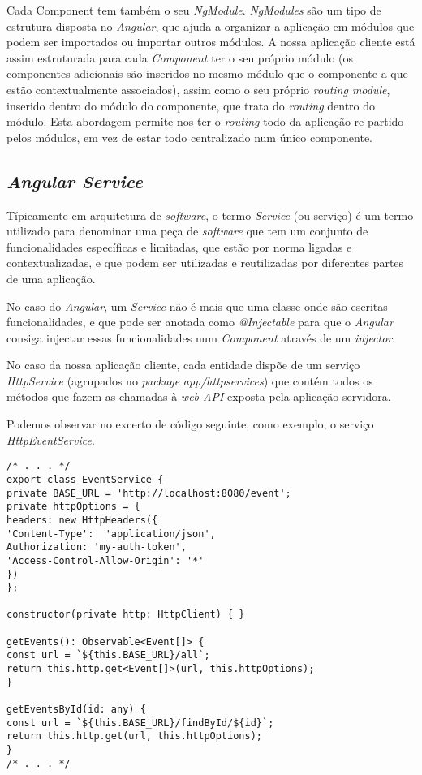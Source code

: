 Cada Component tem também o seu \textit{NgModule}. \textit{NgModules} são um tipo de estrutura disposta no \textit{Angular}, que ajuda a organizar a aplicação em módulos que podem ser importados ou importar outros módulos. A nossa aplicação cliente está assim estruturada para cada \textit{Component} ter o seu próprio módulo (os componentes adicionais são inseridos no mesmo módulo que o componente a que estão contextualmente associados), assim como o seu próprio \textit{routing module}, inserido dentro do módulo do componente, que trata do \textit{routing} dentro do módulo. Esta abordagem permite-nos ter o \textit{routing} todo da aplicação re-partido pelos módulos, em vez de estar todo centralizado num único componente.\\

\subsection{\textit{Angular Service}}\label{sub412}

Típicamente em arquitetura de \emph{software}, o termo \emph{Service} (ou serviço) é um termo utilizado para denominar uma peça de \emph{software} que tem um conjunto de funcionalidades específicas e limitadas, que estão por norma ligadas e contextualizadas, e que podem ser utilizadas e reutilizadas por diferentes partes de uma aplicação. 

No caso do \emph{Angular}, um \textit{Service} não é mais que uma classe onde são escritas funcionalidades, e que pode ser anotada como \emph{@Injectable} para que o \textit{Angular} consiga injectar essas funcionalidades num \textit{Component} através de um \textit{injector}. 

No caso da nossa aplicação cliente, cada entidade dispõe de um serviço \textit{HttpService} (agrupados no \textit{package} \textit{app/httpservices}) que contém todos os métodos que fazem as chamadas à \textit{web API} exposta pela aplicação servidora. 

Podemos observar no excerto de código seguinte, como exemplo, o serviço \textit{HttpEventService}.

\begin{lstlisting}
/* . . . */
export class EventService {
private BASE_URL = 'http://localhost:8080/event';
private httpOptions = {
headers: new HttpHeaders({
'Content-Type':  'application/json',
Authorization: 'my-auth-token',
'Access-Control-Allow-Origin': '*'
})
};

constructor(private http: HttpClient) { }

getEvents(): Observable<Event[]> {
const url = `${this.BASE_URL}/all`;
return this.http.get<Event[]>(url, this.httpOptions);
}

getEventsById(id: any) {
const url = `${this.BASE_URL}/findById/${id}`;
return this.http.get(url, this.httpOptions);
}
/* . . . */
\end{lstlisting}

